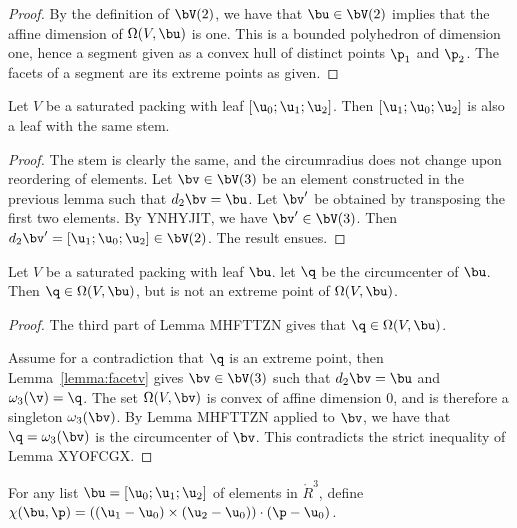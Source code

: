 \begin{proof}  By the definition of $\bV(2)$,  we have that $\bu\in \bV(2)$ implies that
the affine dimension of $\Omega(V,\bu)$ is one.  This is a bounded polyhedron of dimension one,
hence a segment given as a convex hull of distinct points $\p_1$ and $\p_2$.  The facets of a segment
are its extreme points as given.
\end{proof}

\begin{lemma}
Let $V$ be a saturated packing with leaf $[\u_0;\u_1;\u_2]$.  Then $[\u_1;\u_0;\u_2]$ is also a leaf
with the same stem.
\end{lemma}

\begin{proof} The stem is clearly the same, and the circumradius does not change upon reordering of
elements.  Let $\bv\in \bV(3)$ be an element constructed in the previous lemma such that
$d_2\bv=\bu$.  Let $\bv'$ be obtained by transposing the first two elements.  By YNHYJIT,
we have $\bv'\in \bV(3)$.    Then $d_2\bv' = [\u_1;\u_0;\u_2]\in \bV(2)$.  The result ensues.
\end{proof}



\begin{lemma}  Let $V$ be a saturated packing with leaf $\bu$.  let $\q$ be the circumcenter of $\bu$.
Then $\q\in\Omega(V,\bu)$, but is not an extreme point of $\Omega(V,\bu)$.
\end{lemma}

\begin{proof} The third part of Lemma MHFTTZN gives that $\q\in \Omega(V,\bu)$. 

Assume for a contradiction that
$\q$ is an extreme point, then Lemma~\ref{lemma:facetv} gives $\bv\in \bV(3)$ such that
$d_2\bv = \bu$ and $\omega_3(\v)=\q$.  The set $\Omega(V,\bv)$ is convex of affine dimension $0$,
and is therefore a singleton $\omega_3(\bv)$.   By Lemma MHFTTZN applied to $\bv$, we have that
$\q=\omega_3(\bv)$ is the circumcenter of $\bv$.  This contradicts the strict inequality of Lemma XYOFCGX.
\end{proof}

\begin{definition}[$\chi$] For any list $\bu = [\u_0;\u_1;\u_2]$ of  elements in $\ring{R}^3$, define 
$\chi(\bu,\p) = ((\u_1-\u_0)\times (\u_2-\u_0))\cdot(\p-\u_0)$.
\end{definition}




